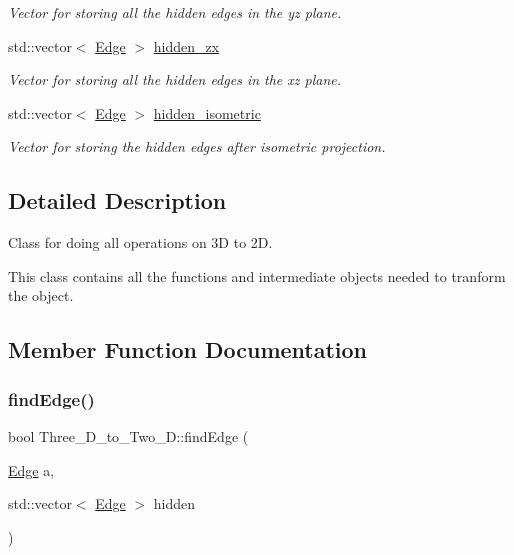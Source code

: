 \begin{DoxyCompactItemize}
\begin{DoxyCompactList}\small\item\em Vector for storing all the hidden edges in the yz plane. \end{DoxyCompactList}\item 
\mbox{\label{class_three___d__to___two___d_a8b540d75837e856cdefd2158f84702ca}} 
std\+::vector$<$ \mbox{\hyperlink{struct_edge}{Edge}} $>$ \mbox{\hyperlink{class_three___d__to___two___d_a8b540d75837e856cdefd2158f84702ca}{hidden\+\_\+zx}}
\begin{DoxyCompactList}\small\item\em Vector for storing all the hidden edges in the xz plane. \end{DoxyCompactList}\item 
\mbox{\label{class_three___d__to___two___d_a6dc4746a67050c903632e2d044b90787}} 
std\+::vector$<$ \mbox{\hyperlink{struct_edge}{Edge}} $>$ \mbox{\hyperlink{class_three___d__to___two___d_a6dc4746a67050c903632e2d044b90787}{hidden\+\_\+isometric}}
\begin{DoxyCompactList}\small\item\em Vector for storing the hidden edges after isometric projection. \end{DoxyCompactList}\end{DoxyCompactItemize}


\subsection{Detailed Description}
Class for doing all operations on 3D to 2D. 

This class contains all the functions and intermediate objects needed to tranform the object. 

\subsection{Member Function Documentation}
\mbox{\label{class_three___d__to___two___d_a925576c935cbabaafa00c1f1e30a600d}} 
\subsubsection{\texorpdfstring{find\+Edge()}{findEdge()}}
{\footnotesize\ttfamily bool Three\+\_\+\+D\+\_\+to\+\_\+\+Two\+\_\+\+D\+::find\+Edge (\begin{DoxyParamCaption}\item[{\mbox{\hyperlink{struct_edge}{Edge}}}]{a,  }\item[{std\+::vector$<$ \mbox{\hyperlink{struct_edge}{Edge}} $>$}]{hidden }\end{DoxyParamCaption})}



